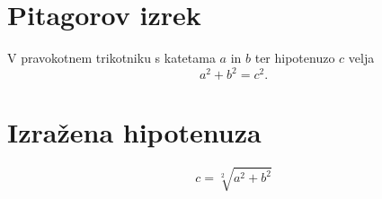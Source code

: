 \documentclass{article}
\begin{document}
\section*{Pitagorov izrek}
V pravokotnem trikotniku s katetama \(a\) in \(b\) ter hipotenuzo \(c\) velja
\[ a^2 + b^2 = c^2. \]
\section*{Izražena hipotenuza}
$$c=\sqrt[2]{a^2+b^2}$$
\end{document}
